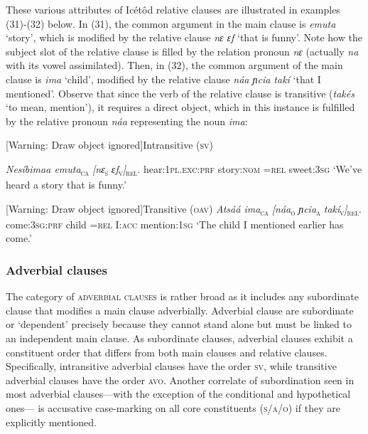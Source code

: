 \begin{table}
These various attributes of Icétôd relative clauses are illustrated in examples (31)-(32) below. In (31), the common argument in the main clause is \textit{emuta }‘story’, which is modified by the relative clause \textit{nɛ ɛf }‘that is funny’. Note how the subject slot of the relative clause is filled by the relation pronoun \textit{nɛ }(actually \textit{na} with its vowel assimilated). Then, in (32), the common argument of the main clause is \textit{ima }‘child’, modified by the relative clause \textit{náa ɲcia takí }‘that I mentioned’. Observe that since the verb of the relative clause is transitive (\textit{takés }‘to mean, mention’), it requires a direct object, which in this instance is fulfilled by the relative pronoun \textit{náa }representing the noun \textit{ima}:




[Warning: Draw object ignored]Intransitive (\textsc{sv})

\textit{Nesíbimaa     emuta}\textsc{\textsubscript{ca}}\textit{   [nɛ}\textsc{\textsubscript{s}}\textit{   ɛf}\textsc{\textsubscript{v}}\textit{]}\textsc{\textsubscript{rel}}.
hear:\textsc{1pl.exc:prf  }story:\textsc{nom}   =\textsc{rel}   sweet:\textsc{3sg}
‘We’ve heard a story that is funny.’


[Warning: Draw object ignored]Transitive (\textsc{oav})
\textit{Atsáá       ima}\textsc{\textsubscript{ca}}\textit{   [náa}\textsc{\textsubscript{o}}\textit{   ɲcia}\textsc{\textsubscript{a}}\textit{   takí}\textsc{\textsubscript{v}}\textit{]}\textsc{\textsubscript{rel}}.
come:\textsc{3sg}:\textsc{prf}   child   =\textsc{rel}   I:\textsc{acc}   mention:\textsc{1sg}
‘The child I mentioned earlier has come.’




\subsubsection{Adverbial clauses}

The category of \textsc{adverbial clauses} is rather broad as it includes any subordinate clause that modifies a main clause adverbially. Adverbial clause are subordinate or ‘dependent’ precisely because they cannot stand alone but must be linked to an independent main clause. As subordinate clauses, adverbial clauses exhibit a constituent order that differs from both main clauses and relative clauses. Specifically, intransitive adverbial clauses have the order \textsc{sv}, while transitive adverbial clauses have the order \textsc{avo}. Another correlate of subordination seen in most adverbial clauses—with the exception of the conditional and hypothetical ones— is accusative case-marking on all core constituents (\textsc{s/a/o}) if they are explicitly mentioned. 


\end{table}
